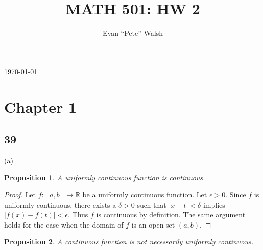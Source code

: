 \documentclass[11pt]{amsart}
\newtheorem*{prop}{Proposition}
\begin{document}
\title{MATH 501: HW 2}
\author{Evan ``Pete'' Walsh}
\today
\maketitle

\section*{Chapter 1}

\subsection*{39} (a)
\begin{prop} 
	A uniformly continuous function is continuous.
\end{prop}

\begin{proof}
	Let $f:[a,b] \longrightarrow \mathbb{R}$ be a uniformly continuous function. Let $\epsilon > 0$. Since $f$ is uniformly continuous, there exists a $\delta > 0$ such that $|x - t| < \delta$ implies $|f(x) - f(t)| < \epsilon$. Thus $f$ is continuous by definition. The same argument holds for the case when the domain of $f$ is an open set $(a,b)$.
\end{proof}

\begin{prop}
	A continuous function is not necessarily uniformly continuous.
\end{prop}
\end{document}
